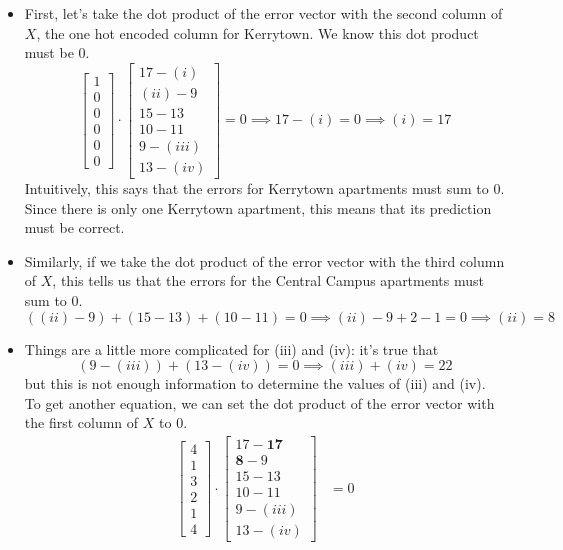 \documentclass[11pt]{article}
\begin{document}
\begin{prob}
\begin{solution}
\begin{itemize}
    \item First, let's take the dot product of the error vector with the second column of $X$, the one hot encoded column for Kerrytown. We know this dot product must be $0$.
    $$\begin{bmatrix} 1 \\ 0 \\ 0 \\ 0 \\ 0 \\ 0 \end{bmatrix} \cdot \begin{bmatrix} 17 - (i) \\ (ii) - 9 \\ 15 - 13 \\ 10 - 11 \\ 9 - (iii) \\ 13 - (iv) \end{bmatrix} = 0 \implies 17 - (i) = 0 \implies \boxed{(i) = 17}$$
    Intuitively, this says that the errors for Kerrytown apartments must sum to $0$. Since there is only one Kerrytown apartment, this means that its prediction must be correct.
    \item Similarly, if we take the dot product of the error vector with the third column of $X$, this tells us that the errors for the Central Campus apartments must sum to $0$.
    $$((ii) - 9) + (15 - 13) + (10 - 11) = 0 \implies (ii) - 9 + 2 - 1 = 0 \implies \boxed{(ii) = 8}$$
    \item Things are a little more complicated for (iii) and (iv): it's true that
    $$(9 - (iii)) + (13 - (iv)) = 0 \implies (iii) + (iv) = 22$$
    but this is not enough information to determine the values of (iii) and (iv). To get another equation, we can set the dot product of the error vector with the first column of $X$ to $0$. \newpage
    \begin{align*}
    \begin{bmatrix} 4 \\ 1 \\ 3 \\ 2 \\ 1 \\ 4 \end{bmatrix} \cdot \begin{bmatrix} 17 - \mathbf{17} \\ \mathbf{8} - 9 \\ 15 - 13 \\ 10 - 11 \\ 9 - (iii) \\ 13 - (iv) \end{bmatrix} &= 0 \\

\end{align*}
\end{itemize}
\end{solution}
\end{prob}
\end{document}
